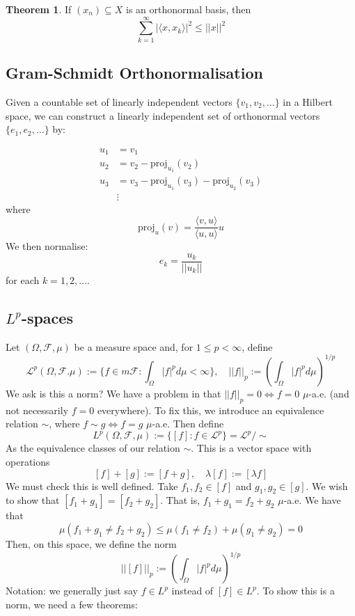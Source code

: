 \documentclass[11pt,a4paper]{article}
\theoremstyle{definition}
\newtheorem{theorem}{Theorem}[section]
\begin{document}
\begin{theorem}
    If $(x_n) \subseteq X$ is an orthonormal basis, then 
    \[
    \sum \limits _{k=1}^\infty |\langle x, x_k \rangle| ^ 2 \le ||x||^2
    \]
\end{theorem}



\subsection*{Gram-Schmidt Orthonormalisation}
Given a countable set of linearly independent vectors $\{v_1, v_2, \dots\}$ in a Hilbert space, we can construct a linearly independent set of orthonormal vectors $\{e_1, e_2, \dots\}$ by:

\begin{align*}
u_1 &= v_1 \\
u_2 &= v_2 - \text{proj}_{u_1}(v_2) \\
u_3 &= v_3 - \text{proj}_{u_1}(v_3) - \text{proj}_{u_2}(v_3) \\
&\vdots
\end{align*}
\noindent
where
\[
\text{proj}_{u}(v) = \frac{\langle v, u \rangle}{\langle u, u \rangle} u
\]
\noindent
We then normalise:
\[
e_k = \frac{u_k}{||u_k||}
\]
\noindent
for each $k = 1, 2, \dots$.



\subsection{$L^p$-spaces}
Let $(\Omega, \mathcal{F}, \mu)$ be a measure space and, for $1 \le p < \infty$, define \[\mathcal{L}^p(\Omega, \mathcal{F}. \mu ) := \{f \in m\mathcal{F}:\int _\Omega |f|^p d\mu < \infty\}, \quad ||f||_p := (\int _\Omega |f|^p d\mu )^{1/p}\]We ask is this a norm? We have a problem in that $||f||_p = 0 \iff f=0$ $\mu $-a.e. (and not necessarily $f = 0$ everywhere). To fix this, we introduce an equivalence relation $\sim $, where $f \sim g \iff f=g$ $\mu$-a.e. Then define \[L^p(\Omega, \mathcal{F}, \mu ) := \{[f]: f \in \mathcal{L}^p\} = \mathcal{L}^p / \sim\]As the equivalence classes of our relation $\sim$. This is a vector space with operations \[[f] + [g] := [f+g], \quad \lambda [f] := [\lambda f]\]We must check this is well defined. Take $f_1, f_2 \in [f]$ and $g_1, g_2 \in [g]$. We wish to show that $[f_1+g_1] = [f_2+g_2]$. That is, $f_1+g_1=f_2+g_2$ $\mu$-a.e. We have that\[
\mu (f_1 + g_1 \ne f_2 + g_2) \le \mu (f_1 \ne f_2) + \mu(g_1 \ne g_2) = 0
\] Then, on this space, we define the norm \[||[f]||_p := \left(\int _\Omega |f|^p d\mu \right)^{1/p}\]Notation: we generally just say $f \in L^p$ instead of $[f] \in L^p$. To show this is a norm, we need a few theorems:
\end{document}
